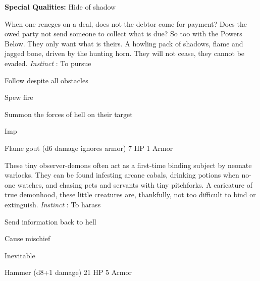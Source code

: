 
       
\startMonsterQualities
         {\bf Special Qualities:}  Hide of shadow
\stopMonsterQualities
       
\startMonsterDescription
When one reneges on a deal, does not the debtor come for payment? Does the owed party not send someone to collect what is due? So too with the Powers Below. They only want what is theirs. A howling pack of shadows, flame and jagged bone, driven by the hunting horn. They will not cease, they cannot be evaded. {\em Instinct} : To pursue
\stopMonsterDescription
       
\startitemize[1,packed]
         
\item Follow despite all obstacles

         
\item Spew fire

         
\item Summon the forces of hell on their target

       
\stopitemize
       
\startMonsterName
Imp	 
\stopMonsterName
       

Flame gout (d6 damage ignores armor)	7 HP	1 Armor

       


       
\startMonsterDescription
These tiny observer-demons often act as a first-time binding subject by neonate warlocks. They can be found infesting arcane cabals, drinking potions when no-one watches, and chasing pets and servants with tiny pitchforks. A caricature of true demonhood, these little creatures are, thankfully, not too difficult to bind or extinguish. {\em Instinct} : To harass
\stopMonsterDescription
       
\startitemize[1,packed]
         
\item Send information back to hell

         
\item Cause mischief

       
\stopitemize
       
\startMonsterName
Inevitable	 
\stopMonsterName
       

Hammer (d8+1 damage)	21 HP	5 Armor

       

